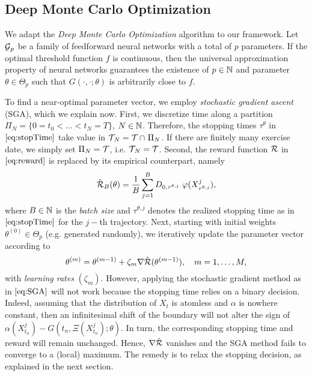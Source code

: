 \subsection{Deep Monte Carlo Optimization} \label{sec:DMCO}
We adapt the \textit{Deep Monte Carlo Optimization} algorithm \cite{HanJentzenE} to our framework. Let $\operatorname{\mathcal{G}}_p$ be a family of feedforward neural networks  with a total of $p$ parameters. If the optimal threshold function $f$ is continuous, then the universal approximation property of neural networks  \cite{Cybenko,Hornik} guarantees the existence of $p\in \operatorname{\mathbb{N}}$ and parameter $\theta \in \Theta_p$ such that $G(\cdot,\cdot;\theta)$ is arbitrarily close to $f$.  

To find a near-optimal parameter vector, we employ  \textit{stochastic gradient ascent} (SGA), which we explain now. First, we discretize time along a partition $\Pi_N = \{0 = t_0 < \ldots < t_N=T\}$, $N\in \operatorname{\mathbb{N}}$. Therefore, the stopping times $\tau^{\theta}$ in $\eqref{eq:stopTime}$ take value in   $\operatorname{\mathcal{T}}_{\!N} = \operatorname{\mathcal{T}} \cap \ \Pi_N$. %
If there are finitely many exercise date, we simply set $\Pi_N = \operatorname{\mathcal{T}}$, i.e. $\operatorname{\mathcal{T}}_{\!N} = \operatorname{\mathcal{T}}$. 
Second, the reward function $\operatorname{\mathcal{R}}$ in $\eqref{eq:reward}$ is replaced by its empirical counterpart, namely
\begin{equation}\label{eq:empReward1}
    \hat{\calR}_B(\theta) = \frac{1}{B}\sum_{j=1}^B   D_{0,\tau^{\theta,j}}  \ \varphi(X_{\tau^{\theta,j}}^j),
\end{equation}
where $B\in \operatorname{\mathbb{N}}$ is the \textit{batch size} and  $\tau^{\theta,j}$ denotes the realized  stopping time as in $\eqref{eq:stopTime}$ for the $j-$th trajectory. Next, 
starting with initial weights  $\theta^{(0)}\in \Theta_p$ (e.g. generated randomly), we iteratively update the parameter vector  according to 
\begin{equation}\label{eq:SGA}
\theta^{(m)} = \theta^{(m-1)} + \zeta_m \nabla \hat{\operatorname{\mathcal{R}}}(\theta^{(m-1)}), \quad m=1,\ldots, M,  
\end{equation}
with \textit{learning rates} $(\zeta_m)$. 
However, applying the stochastic gradient method as in $\eqref{eq:SGA}$ will not work because the stopping time relies on a binary decision.  Indeed, assuming that the distribution of $X_t$ is atomless and $\alpha$ is nowhere constant, then an infinitesimal shift of the boundary will not alter the sign of  $\alpha(X^{j}_{t_n}) - G(t_n,\Xi(X^{j}_{t_n}); \theta)$. In turn, the corresponding stopping time and  reward will remain unchanged. 
Hence, $\nabla \hat{\operatorname{\mathcal{R}}}$ vanishes and the SGA method fails to  converge to a (local) maximum. 
The remedy is to relax the stopping decision, as  explained in the next section. 
